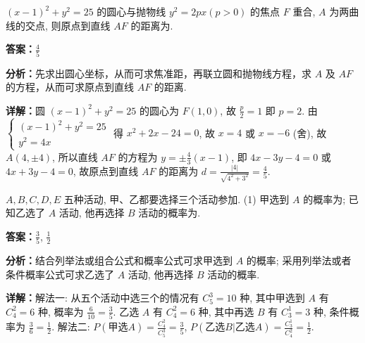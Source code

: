 \begin{question}[points=5]
$(x-1)^2+y^2=25$ 的圆心与抛物线 $y^2=2px(p>0)$ 的焦点 $F$ 重合, $A$ 为两曲线的交点, 则原点到直线 $AF$ 的距离为.
\fillin[{$\frac{4}{5}$}]
\begin{solution}
\textbf{答案：}$\frac{4}{5}$

\textbf{分析：}先求出圆心坐标，从而可求焦准距，再联立圆和抛物线方程，求 $A$ 及 $AF$ 的方程，从而可求原点到直线 $AF$ 的距离.

\textbf{详解：}圆 $(x-1)^2+y^2=25$ 的圆心为 $F(1,0)$, 故 $\frac{p}{2}=1$ 即 $p=2$. 由 $\begin{cases} (x-1)^2+y^2=25 \\ y^2=4x \end{cases}$ 得 $x^2+2x-24=0$, 故 $x=4$ 或 $x=-6$ (舍), 故 $A(4,\pm4)$, 所以直线 $AF$ 的方程为 $y=\pm\frac{4}{3}(x-1)$, 即 $4x-3y-4=0$ 或 $4x+3y-4=0$, 故原点到直线 $AF$ 的距离为 $d=\frac{|4|}{\sqrt{4^2+3^2}}=\frac{4}{5}$.
\end{solution}
\end{question}

\begin{question}[points=5]
$A,B,C,D,E$ 五种活动, 甲、乙都要选择三个活动参加. (1) 甲选到 $A$ 的概率为; 已知乙选了 $A$ 活动, 他再选择 $B$ 活动的概率为.
\begin{solution}
\textbf{答案：}$\frac{3}{5}$, $\frac{1}{2}$

\textbf{分析：}结合列举法或组合公式和概率公式可求甲选到 $A$ 的概率; 采用列举法或者条件概率公式可求乙选了 $A$ 活动, 他再选择 $B$ 活动的概率.

\textbf{详解：}解法一: 从五个活动中选三个的情况有 $C_5^3=10$ 种, 其中甲选到 $A$ 有 $C_4^2=6$ 种, 概率为 $\frac{6}{10}=\frac{3}{5}$. 乙选 $A$ 有 $C_4^2=6$ 种, 其中再选 $B$ 有 $C_3^1=3$ 种, 条件概率为 $\frac{3}{6}=\frac{1}{2}$. 解法二: $P(\text{甲选}A)=\frac{C_4^2}{C_5^3}=\frac{3}{5}$, $P(\text{乙选}B|\text{乙选}A)=\frac{C_3^1}{C_4^2}=\frac{1}{2}$.
\end{solution}
\end{question}

